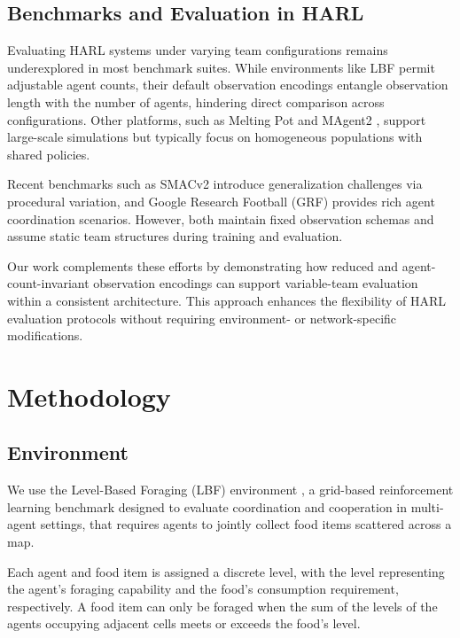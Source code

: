 \documentclass{article}
\begin{document}
\subsection{Benchmarks and Evaluation in HARL}

Evaluating HARL systems under varying team configurations remains underexplored in most
benchmark suites. While environments like LBF \cite{papoudakis2021} permit adjustable agent counts,
their default observation encodings entangle observation length with the number of agents,
hindering direct comparison across configurations. Other platforms, such as Melting Pot
\cite{leibo2021} and MAgent2 \cite{zheng2017}, support large-scale simulations but typically focus
on homogeneous populations with shared policies.

Recent benchmarks such as SMACv2 \cite{ellis2023} introduce generalization challenges via
procedural variation, and Google Research Football (GRF) \cite{kurach2020} provides rich agent
coordination scenarios. However, both maintain fixed observation schemas and assume static team
structures during training and evaluation.

Our work complements these efforts by demonstrating how reduced and agent-count-invariant
observation encodings can support variable-team evaluation within a consistent architecture.
This approach enhances the flexibility of HARL evaluation protocols without requiring environment- or
network-specific modifications.

\section{Methodology}


\subsection{Environment}

We use the Level-Based Foraging (LBF) environment \cite{papoudakis2021},
a grid-based reinforcement learning benchmark designed to evaluate 
coordination and cooperation in multi-agent settings,
that requires agents to jointly collect food items scattered across a map. 

Each agent and food item is assigned a discrete level, with the level representing 
the agent's foraging capability and the food's consumption requirement, respectively.
A food item can only be foraged when the sum of the levels of the agents 
occupying adjacent cells meets or exceeds the food's level.
\end{document}
